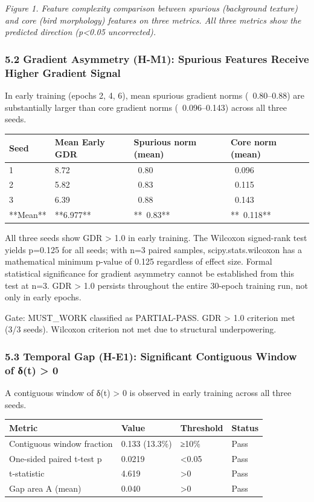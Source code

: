 \textit{Figure 1. Feature complexity comparison between spurious (background texture) and core (bird morphology) features on three metrics. All three metrics show the predicted direction (p<0.05 uncorrected).}

\subsubsection{5.2 Gradient Asymmetry (H-M1): Spurious Features Receive Higher Gradient Signal}

In early training (epochs 2, 4, 6), mean spurious gradient norms (~0.80–0.88) are substantially larger than core gradient norms (~0.096–0.143) across all three seeds.

\begin{table}[htbp]
\centering
\begin{tabular}{llll}
\toprule
Seed & Mean Early GDR & Spurious norm (mean) & Core norm (mean) \\
\midrule
1 & 8.72 & ~0.80 & ~0.096 \\
2 & 5.82 & ~0.83 & ~0.115 \\
3 & 6.39 & ~0.88 & ~0.143 \\
**Mean** & **6.977** & **~0.83** & **~0.118** \\
\bottomrule
\end{tabular}
\end{table}

All three seeds show GDR > 1.0 in early training. The Wilcoxon signed-rank test yields p=0.125 for all seeds; with n=3 paired samples, scipy.stats.wilcoxon has a mathematical minimum p-value of 0.125 regardless of effect size. Formal statistical significance for gradient asymmetry cannot be established from this test at n=3. GDR > 1.0 persists throughout the entire 30-epoch training run, not only in early epochs.

Gate: MUST\_WORK classified as PARTIAL-PASS. GDR > 1.0 criterion met (3/3 seeds). Wilcoxon criterion not met due to structural underpowering.

\subsubsection{5.3 Temporal Gap (H-E1): Significant Contiguous Window of δ(t) > 0}

A contiguous window of δ(t) > 0 is observed in early training across all three seeds.

\begin{table}[htbp]
\centering
\begin{tabular}{llll}
\toprule
Metric & Value & Threshold & Status \\
\midrule
Contiguous window fraction & 0.133 (13.3\%) & ≥10\% & Pass \\
One-sided paired t-test p & 0.0219 & <0.05 & Pass \\
t-statistic & 4.619 & >0 & Pass \\
Gap area A (mean) & 0.040 & >0 & Pass \\
\bottomrule
\end{tabular}
\end{table}

